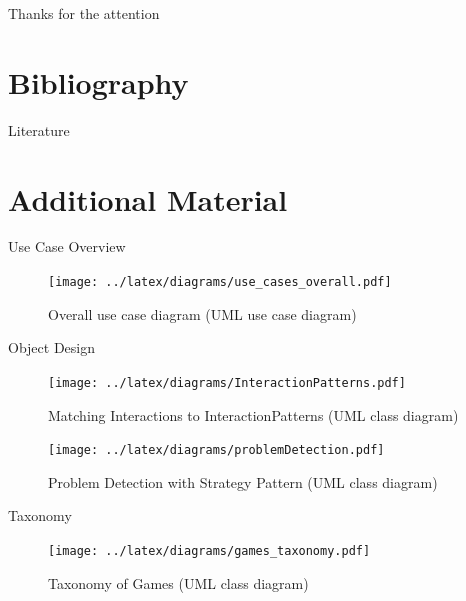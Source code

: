 \documentclass[compress]{beamer}
\begin{document}
\begin{frame}
\begin{center}
\huge
Thanks for the attention
\end{center}
\end{frame}

\appendix
{}


\section{Bibliography}
\begin{frame}[allowframebreaks]{Literature}
\tiny{}
\end{frame}

\section{Additional Material}
\begin{frame}{Use Case Overview}
\begin{figure}
    \centering
    \texttt{[image: ../latex/diagrams/use\_cases\_overall.pdf]}
    \caption{Overall use case diagram (UML use case diagram)}
\end{figure}
\end{frame}

\begin{frame}[allowframebreaks]{Object Design}
\begin{figure}
    \centering
    \texttt{[image: ../latex/diagrams/InteractionPatterns.pdf]}
    \caption{Matching Interactions to InteractionPatterns (UML class diagram)}
\end{figure}

\begin{figure}
    \centering
    \texttt{[image: ../latex/diagrams/problemDetection.pdf]}
    \caption{Problem Detection with Strategy Pattern (UML class diagram)}
\end{figure}
\end{frame}

\begin{frame}{Taxonomy}
\begin{figure}
    \centering
    \texttt{[image: ../latex/diagrams/games\_taxonomy.pdf]}
    \caption[Taxonomy of Games (UML class diagram)]
    {Taxonomy of Games (UML class diagram)}
    \label{taxonomy_games}
\end{figure}
\end{frame}
\end{document}
